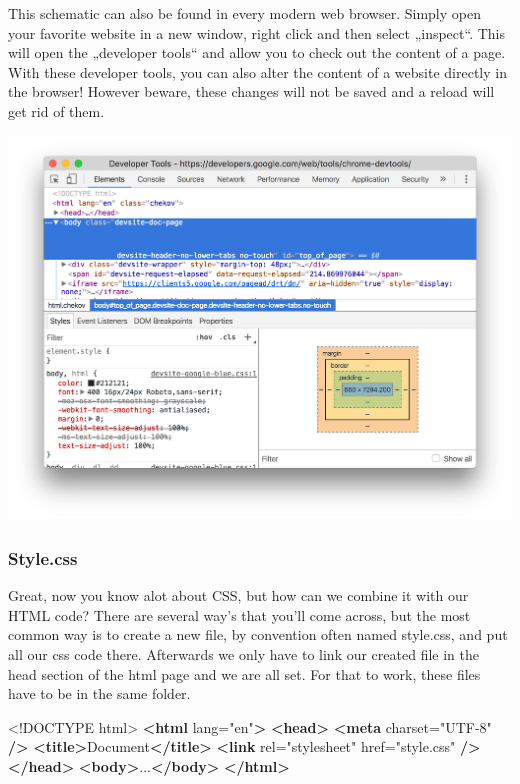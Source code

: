 \documentclass[
]{article}
\newenvironment{Shaded}{\begin{snugshade}}{\end{snugshade}}
\newcommand{\DataTypeTok}[1]{\textcolor[rgb]{0.13,0.29,0.53}{#1}}
\newcommand{\KeywordTok}[1]{\textcolor[rgb]{0.13,0.29,0.53}{\textbf{#1}}}
\newcommand{\NormalTok}[1]{#1}
\newcommand{\OtherTok}[1]{\textcolor[rgb]{0.56,0.35,0.01}{#1}}
\newcommand{\StringTok}[1]{\textcolor[rgb]{0.31,0.60,0.02}{#1}}
\begin{document}
This schematic can also be found in every modern web browser. Simply open your favorite website in a new window, right click and then select „inspect``. This will open the „developer tools`` and allow you to check out the content of a page. With these developer tools, you can also alter the content of a website directly in the browser! However beware, these changes will not be saved and a reload will get rid of them.

\includegraphics{docs/assets/ta-website.png}

\hypertarget{style.css}{%
\subsubsection*{Style.css}\label{style.css}}

Great, now you know alot about CSS, but how can we combine it with our HTML code? There are several way's that you'll come across, but the most common way is to create a new file, by convention often named style.css, and put all our css code there. Afterwards we only have to link our created file in the head section of the html page and we are all set. For that to work, these files have to be in the same folder.

\begin{Shaded}
\begin{Highlighting}[]
\DataTypeTok{<!DOCTYPE }\NormalTok{html}\DataTypeTok{>}
\KeywordTok{<html}\OtherTok{ lang=}\StringTok{"en"}\KeywordTok{>}
  \KeywordTok{<head>}
    \KeywordTok{<meta}\OtherTok{ charset=}\StringTok{"UTF-8"} \KeywordTok{/>}
    \KeywordTok{<title>}\NormalTok{Document}\KeywordTok{</title>}
    \KeywordTok{<link}\OtherTok{ rel=}\StringTok{"stylesheet"}\OtherTok{ href=}\StringTok{"style.css"} \KeywordTok{/>}
  \KeywordTok{</head>}
  \KeywordTok{<body>}\NormalTok{...}\KeywordTok{</body>}
\KeywordTok{</html>}
\end{Highlighting}
\end{Shaded}
\end{document}

